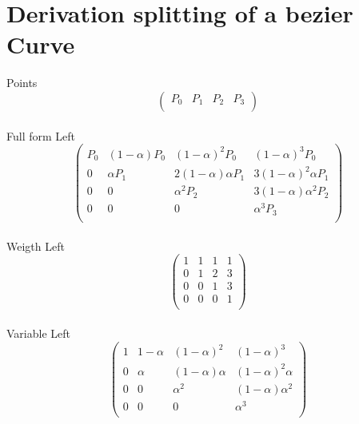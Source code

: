 \section{Derivation splitting of a bezier Curve}

Points
\begin{equation*}
    \left(
    \begin{array}{cccc}
        P_0 & P_1 & P_2 & P_3 \\
    \end{array}
    \right)
\end{equation*}
\\
Full form Left
\begin{equation*}
    \left(
    \begin{array}{cccc}
        P_0 & (1-\alpha ) P_0 & (1-\alpha )^2 P_0         & (1-\alpha )^3 P_0           \\
        0   & \alpha  P_1     & 2 (1-\alpha ) \alpha  P_1 & 3 (1-\alpha )^2 \alpha  P_1 \\
        0   & 0               & \alpha ^2 P_2             & 3 (1-\alpha ) \alpha ^2 P_2 \\
        0   & 0               & 0                         & \alpha ^3 P_3               \\
    \end{array}
    \right)
\end{equation*}
\\
Weigth Left
\begin{equation*}
    \left(
    \begin{array}{cccc}
        1 & 1 & 1 & 1 \\
        0 & 1 & 2 & 3 \\
        0 & 0 & 1 & 3 \\
        0 & 0 & 0 & 1 \\
    \end{array}
    \right)
\end{equation*}
\\
Variable Left
\begin{equation*}
    \left(
    \begin{array}{cccc}
        1 & 1-\alpha & (1-\alpha )^2      & (1-\alpha )^3         \\
        0 & \alpha   & (1-\alpha ) \alpha & (1-\alpha )^2 \alpha  \\
        0 & 0        & \alpha ^2          & (1-\alpha ) \alpha ^2 \\
        0 & 0        & 0                  & \alpha ^3             \\
    \end{array}
    \right)
\end{equation*}
